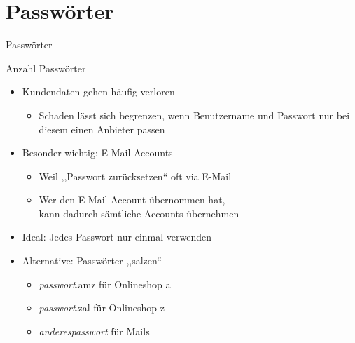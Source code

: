\section{Passwörter}

\begin{frame}{Passwörter}


\end{frame}

\begin{frame}{Anzahl Passwörter}
  \begin{itemize}
    \item Kundendaten gehen häufig verloren
    \begin{itemize}
      \item Schaden lässt sich begrenzen, wenn Benutzername und Passwort nur bei diesem einen Anbieter passen
    \end{itemize}
    \item Besonder wichtig: E-Mail-Accounts
    \begin{itemize}
      \item Weil ,,Passwort zurücksetzen`` oft via E-Mail
      \item Wer den E-Mail Account-übernommen hat,\\ kann dadurch sämtliche Accounts übernehmen
    \end{itemize}
    \item Ideal: Jedes Passwort nur einmal verwenden
    \item Alternative: Passwörter ,,salzen``
    \begin{itemize}
      \item \textit{passwort}.amz für Onlineshop a
      \item \textit{passwort}.zal für Onlineshop z
      \item \textit{anderespasswort} für Mails
    \end{itemize}
  \end{itemize}
\end{frame}

